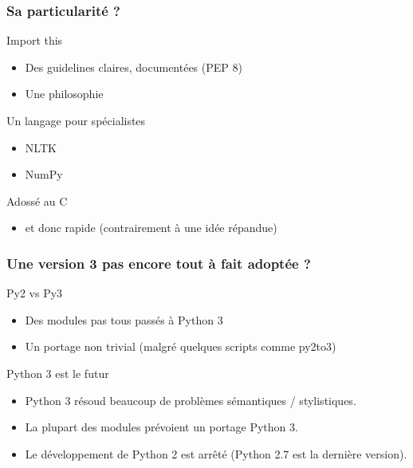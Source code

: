 \documentclass{beamer}
\begin{document}
\begin{frame}
  \frametitle{Sa particularité ?}
  
  \begin{block}{Import this}
    \begin{itemize}
    \item Des guidelines claires, documentées (PEP 8)
    \item Une philosophie
    \end{itemize}
  \end{block}

  \begin{block}{Un langage pour spécialistes}
    \begin{itemize}
    \item NLTK
    \item NumPy
    \end{itemize}
  \end{block}

  \begin{block}{Adossé au C}
    \begin{itemize}
    \item et donc rapide (contrairement à une idée répandue)
    \end{itemize}
  \end{block}

\end{frame}

\begin{frame}
  \frametitle{Une version 3 pas encore tout à fait adoptée ?}

  \begin{block}{Py2 vs Py3}
    \begin{itemize}
    \item Des modules pas tous passés à Python 3
    \item Un portage non trivial (malgré quelques scripts comme py2to3)
    \end{itemize}
  \end{block}

  \begin{block}{Python 3 est le futur}
    \begin{itemize}
    \item Python 3 résoud beaucoup de problèmes sémantiques / stylistiques.
    \item La plupart des modules prévoient un portage Python 3.
    \item Le développement de Python 2 est arrêté (Python 2.7 est la
      dernière version).
    \end{itemize}
  \end{block}
\end{frame}
\end{document}
